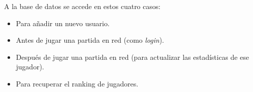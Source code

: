 A la base de datos se accede en estos cuatro casos:
\begin{itemize}
\item Para añadir un nuevo usuario.
\item Antes de jugar una partida en red (como \emph{login}).
\item Después de jugar una partida en red (para actualizar las estadísticas
de ese jugador).
\item Para recuperar el ranking de jugadores.
\end{itemize}

